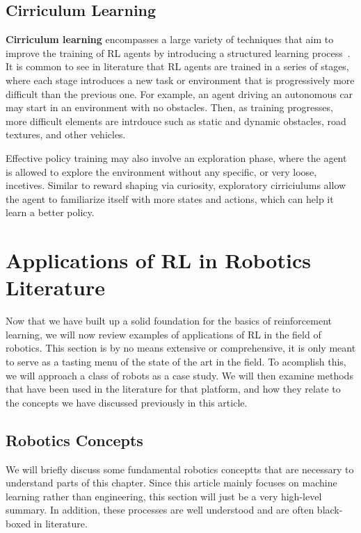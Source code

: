 \documentclass[12pt]{report}
\theoremstyle{definition}
\theoremstyle{remark}
\begin{document}
\section{Cirriculum Learning}
\textbf{Cirriculum learning} encompasses a large variety of techniques that aim to improve the training of RL agents by introducing a structured learning process~\cite{narvekar_curriculum_2020}. It is common to see in literature that RL agents are trained in a series of stages, where each stage introduces a new task or environment that is progressively more difficult than the previous one. For example, an agent driving an autonomous car may start in an environment with no obstacles. Then, as training progresses, more difficult elements are intrdouce such as static and dynamic obstacles, road textures, and other vehicles.

Effective policy training may also involve an exploration phase, where the agent is allowed to explore the environment without any specific, or very loose, incetives. Similar to reward shaping via curiosity, exploratory cirriciulums allow the agent to familiarize itself with more states and actions, which can help it learn a better policy.

\chapter{Applications of RL in Robotics Literature}
Now that we have built up a solid foundation for the basics of reinforcement learning, we will now review examples of applications of RL in the field of robotics. This section is by no means extensive or comprehensive, it is only meant to serve as a tasting menu of the state of the art in the field. To acomplish this, we will approach a class of robots as a case study. We will then examine methods that have been used in the literature for that platform, and how they relate to the concepts we have discussed previously in this article.

\section{Robotics Concepts}
We will briefly discuss some fundamental robotics conceptts that are necessary to understand parts of this chapter. Since this article mainly focuses on machine learning rather than engineering, this section will just be a very high-level summary. In addition, these processes are well understood and are often black-boxed in literature.
\end{document}
